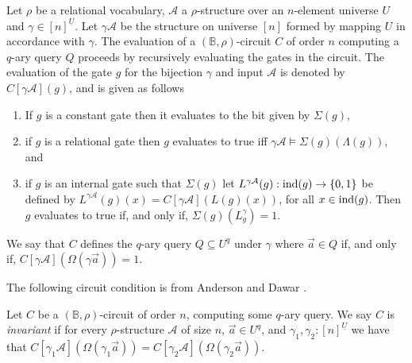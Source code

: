 \documentclass[../paper.tex]{subfiles}
\begin{document}

Let $\rho$ be a relational vocabulary, $\mathcal{A}$ a $\rho$-structure over an
$n$-element universe $U$ and $\gamma \in [n]^{\underline{U}}$. Let $\gamma
\mathcal{A}$ be the structure on universe $[n]$ formed by mapping $U$ in
accordance with $\gamma$. The evaluation of a $(\mathbb{B}, \rho)$-circuit $C$
of order $n$ computing a $q$-ary query $Q$ proceeds by recursively evaluating
the gates in the circuit. The evaluation of the gate $g$ for the bijection
$\gamma$ and input $\mathcal{A}$ is denoted by $C[\gamma \mathcal{A}](g)$, and
is given as follows
\begin{enumerate}
  \setlength\itemsep{0mm}
\item If $g$ is a constant gate then it evaluates to the bit given by
  $\Sigma(g)$,
\item if $g$ is a relational gate then $g$ evaluates to true iff $\gamma
  \mathcal{A} \models \Sigma(g)(\Lambda (g))$, and
\item if $g$ is an internal gate such that $\Sigma (g)$ let $L^{\gamma
    \mathcal{A}}(g): \text{\upshape ind}(g) \rightarrow \{0,1\}$ be defined by
  $L^{\gamma\mathcal{A}}(g)(x) = C[\gamma \mathcal{A}](L(g)(x))$, for all $x \in
  \text{\upshape ind}(g)$. Then $g$ evaluates to true if, and only if, $\Sigma(g)
  (L^{\gamma}_g) = 1$.
\end{enumerate}
We say that $C$ defines the $q$-ary query $Q \subseteq U^q$ under $\gamma$ where
$\vec{a} \in Q$ if, and only if, $C[\gamma \mathcal{A}](\Omega (\gamma \vec{a}))
= 1$.


The following circuit condition is from Anderson and Dawar \cite{AndersonD17}.

\begin{definition}
  Let $C$ be a $(\mathbb{B}, \rho)$-circuit of order $n$, computing some $q$-ary
  query. We say $C$ is \emph{invariant} if for every $\rho$-structure
  $\mathcal{A}$ of size $n$, $\vec{a} \in U^{q}$, and $\gamma_1, \gamma_2:
  [n]^{\underline{U}}$ we have that $C[\gamma_1 \mathcal{A}](\Omega (\gamma_1
  \vec{a})) = C[\gamma_2 \mathcal{A}](\Omega (\gamma_2 \vec{a}))$.
\end{definition}
\end{document}
